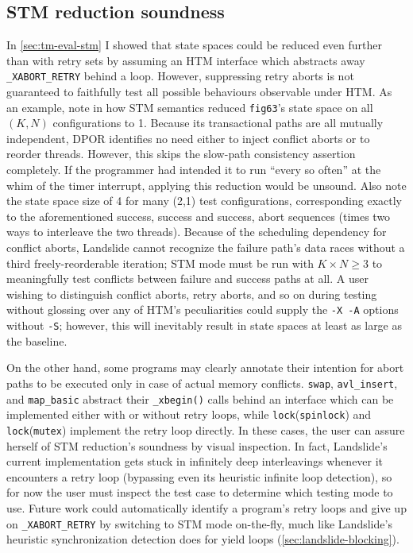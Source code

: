 \subsection{STM reduction soundness}

In \cref{sec:tm-eval-stm} I showed that state spaces could be reduced even further than with retry sets
by assuming an HTM interface which abstracts away {\tt \_XABORT\_RETRY} behind a loop.
However, suppressing retry aborts is not guaranteed to faithfully test all possible behaviours
observable under HTM.
As an example, note in 
how STM semantics reduced %
{\tt fig63}'s state space on all $(K,N)$ configurations to 1.
Because its transactional paths are all mutually independent,
DPOR identifies no need either to inject conflict aborts or to reorder threads.
However, this skips the slow-path consistency assertion completely.
If the programmer had intended it to run ``every so often'' at the whim of the timer interrupt,
applying this reduction would be unsound.
Also note the state space size of 4 for many (2,1) test configurations,
corresponding exactly to the aforementioned success, success and success, abort sequences
(times two ways to interleave the two threads).
Because of the scheduling dependency for conflict aborts,
Landslide cannot recognize the failure path's data races
without a third freely-reorderable iteration;
STM mode must be run with $K \times N \ge 3$ to meaningfully test conflicts between failure and success paths at all.
A user wishing to distinguish conflict aborts, retry aborts, and so on during testing
without glossing over any of HTM's peculiarities
could supply the {\tt -X -A} options without {\tt -S};
however, this will inevitably result in state spaces at least as large as the baseline.

On the other hand, some programs may clearly annotate their intention
for abort paths to be executed only in case of actual memory conflicts.
{\tt swap}, {\tt avl\_insert}, and {\tt map\_basic} abstract their {\tt \_xbegin()} calls
behind an interface which can be implemented either with or without retry loops,
while {\tt lock}({\tt spinlock}) and {\tt lock}({\tt mutex}) implement the retry loop directly.
In these cases, the user can assure herself of STM reduction's soundness by visual inspection.
In fact, Landslide's current implementation gets stuck in infinitely deep interleavings
whenever it encounters a retry loop
(bypassing even its heuristic infinite loop detection),
so for now the user must inspect the test case to determine which testing mode to use.
Future work could automatically identify a program's retry loops
and give up on {\tt \_XABORT\_RETRY} by switching to STM mode on-the-fly,
much like Landslide's heuristic synchronization detection does for yield loops (\cref{sec:landslide-blocking}).

